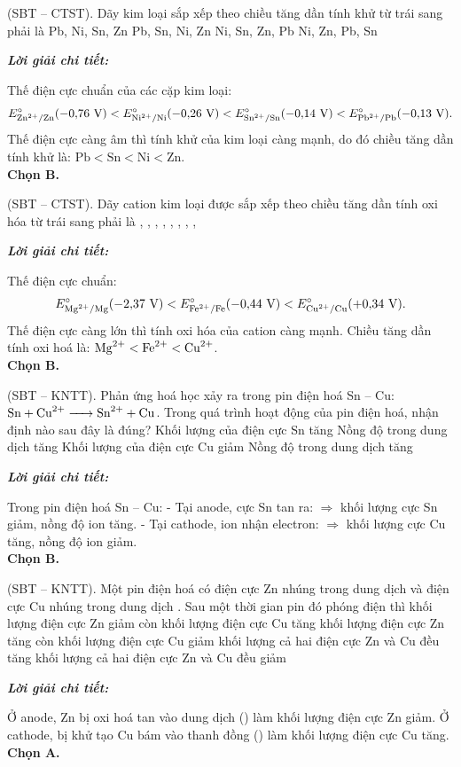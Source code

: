 \documentclass[11pt,a4paper]{article}
\def\loigiai#1{
\par\begingroup\color{blue!80!black}\small
\noindent\textbf{\textit{Lời giải chi tiết:}}\par
#1\par\endgroup}
\begin{document}
\begin{ex}
(SBT -- CTST). Dãy kim loại sắp xếp theo chiều tăng dần tính khử từ trái sang phải là
\choice
{Pb, Ni, Sn, Zn}
{\True Pb, Sn, Ni, Zn}
{Ni, Sn, Zn, Pb}
{Ni, Zn, Pb, Sn}
\loigiai{
Thế điện cực chuẩn của các cặp kim loại:
$$E^\circ_{\ce{Zn^2+/Zn}} (-0{,}76\text{ V}) < E^\circ_{\ce{Ni^2+/Ni}} (-0{,}26\text{ V}) < E^\circ_{\ce{Sn^2+/Sn}} (-0{,}14\text{ V}) < E^\circ_{\ce{Pb^2+/Pb}} (-0{,}13\text{ V}).$$
Thế điện cực càng âm thì tính khử của kim loại càng mạnh, do đó chiều tăng dần tính khử là: $\text{Pb} < \text{Sn} < \text{Ni} < \text{Zn}$.\\
\textbf{Chọn B.}}
\end{ex}

\begin{ex}
(SBT -- CTST). Dãy cation kim loại được sắp xếp theo chiều tăng dần tính oxi hóa từ trái sang phải là
\choice
{, , }
{\True {}, , }
{, , }
{, , }
\loigiai{
Thế điện cực chuẩn:
$$E^\circ_{\ce{Mg^2+/Mg}} (-2{,}37\text{ V}) < E^\circ_{\ce{Fe^2+/Fe}} (-0{,}44\text{ V}) < E^\circ_{\ce{Cu^2+/Cu}} (+0{,}34\text{ V}).$$
Thế điện cực càng lớn thì tính oxi hóa của cation càng mạnh. Chiều tăng dần tính oxi hoá là: $\ce{Mg^2+} < \ce{Fe^2+} < \ce{Cu^2+}$.\\
\textbf{Chọn B.}}
\end{ex}

\begin{ex}
(SBT -- KNTT). Phản ứng hoá học xảy ra trong pin điện hoá Sn -- Cu: $\ce{Sn + Cu^2+ -> Sn^2+ + Cu}$. Trong quá trình hoạt động của pin điện hoá, nhận định nào sau đây là đúng?
\choice
{Khối lượng của điện cực Sn tăng}
{\True Nồng độ  trong dung dịch tăng}
{Khối lượng của điện cực Cu giảm}
{Nồng độ  trong dung dịch tăng}
\loigiai{
Trong pin điện hoá Sn -- Cu:
- Tại anode, cực Sn tan ra: \ce{Sn -> Sn^2+ + 2e} $\Rightarrow$ khối lượng cực Sn giảm, nồng độ ion \ce{Sn^2+} tăng.
- Tại cathode, ion \ce{Cu^2+} nhận electron: \ce{Cu^2+ + 2e -> Cu} $\Rightarrow$ khối lượng cực Cu tăng, nồng độ ion \ce{Cu^2+} giảm.\\
\textbf{Chọn B.}}
\end{ex}

\begin{ex}
(SBT -- KNTT). Một pin điện hoá có điện cực Zn nhúng trong dung dịch  và điện cực Cu nhúng trong dung dịch . Sau một thời gian pin đó phóng điện thì
\choice
{\True khối lượng điện cực Zn giảm còn khối lượng điện cực Cu tăng}
{khối lượng điện cực Zn tăng còn khối lượng điện cực Cu giảm}
{khối lượng cả hai điện cực Zn và Cu đều tăng}
{khối lượng cả hai điện cực Zn và Cu đều giảm}
\loigiai{
Ở anode, Zn bị oxi hoá tan vào dung dịch (\ce{Zn -> Zn^2+ + 2e}) làm khối lượng điện cực Zn giảm. Ở cathode, \ce{Cu^2+} bị khử tạo Cu bám vào thanh đồng (\ce{Cu^2+ + 2e -> Cu}) làm khối lượng điện cực Cu tăng.\\
\textbf{Chọn A.}}
\end{ex}
\end{document}
